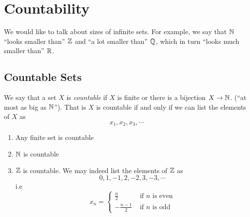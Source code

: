 \documentclass{article}
\begin{document}
\section{Countability}
We would like to talk about sizes of infinite sets. 
For example, we say that $\mathbb{N}$ ``looks smaller than'' $\mathbb{Z}$ and ``a lot smaller than'' $\mathbb{Q}$,
which in turn ``looks much smaller than'' $\mathbb{R}$.

\subsection{Countable Sets}
\begin{defi}[Countable]
    We say that a set $X$ is \emph{countable} if $X$ is finite or there is a bijection $X \rightarrow \mathbb{N}$.
    (``at most as big as $\mathbb{N}$''). That is $X$ is countable if and only if we can list the elements of $X$ as
    \[
        x_1, x_2, x_3, \cdots  
    \]
\end{defi}

\begin{eg}
    \begin{enumerate}[label=(\arabic*)]
        \item Any finite set is countable
        \item $\mathbb{N}$ is countable
        \item $\mathbb{Z}$ is countable.
        We may indeed list the elements of $\mathbb{Z}$ as
        \[
            0, 1, -1, 2, -2, 3, -3, \cdots  
        \]
        i.e
        \[
            x_n = \begin{cases}
                \frac{n}{2} & \text{ if } n \text{ is even} \\
                -\frac{n-1}{2} & \text{ if } n \text{ is odd}
            \end{cases}
        \]
    \end{enumerate}
\end{eg}
\end{document}
